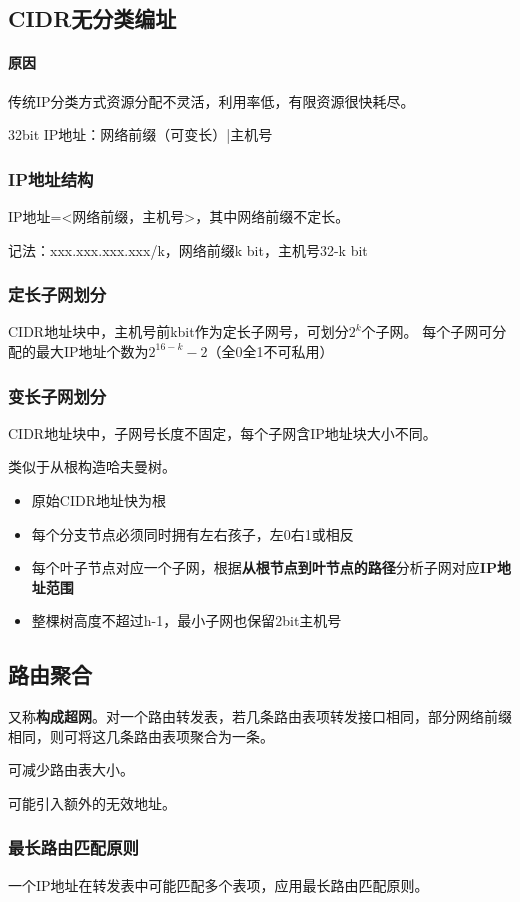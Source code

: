 \subsection{CIDR无分类编址}

\paragraph{原因}
传统IP分类方式资源分配不灵活，利用率低，有限资源很快耗尽。

32bit IP地址：网络前缀（可变长）|主机号


\subsubsection{IP地址结构}
IP地址=<网络前缀，主机号>，其中网络前缀不定长。

记法：xxx.xxx.xxx.xxx/k，网络前缀k bit，主机号32-k bit



\subsubsection{定长子网划分}
CIDR地址块中，主机号前kbit作为定长子网号，可划分\(2^k\)个子网。
每个子网可分配的最大IP地址个数为\(2^{16 - k} - 2\)（全0全1不可私用）


\subsubsection{变长子网划分}
CIDR地址块中，子网号长度不固定，每个子网含IP地址块大小不同。

类似于从根构造哈夫曼树。\begin{itemize}
    \item 原始CIDR地址快为根
    \item 每个分支节点必须同时拥有左右孩子，左0右1或相反
    \item 每个叶子节点对应一个子网，根据\textbf{从根节点到叶节点的路径}分析子网对应\textbf{IP地址范围}
    \item 整棵树高度不超过h-1，最小子网也保留2bit主机号
\end{itemize}


\subsection{路由聚合}
又称\textbf{构成超网}。对一个路由转发表，若几条路由表项转发接口相同，部分网络前缀相同，则可将这几条路由表项聚合为一条。

可减少路由表大小。

可能引入额外的无效地址。

\subsubsection{最长路由匹配原则}
一个IP地址在转发表中可能匹配多个表项，应用最长路由匹配原则。










